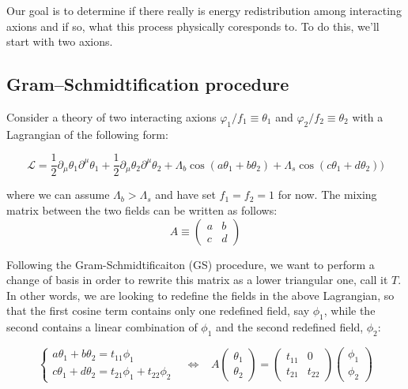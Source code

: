 \documentclass[11pt]{article}
\begin{document}
Our goal is to determine if there really is energy redistribution among interacting axions and if so, what this process physically coresponds to. To do this, we'll start with two axions.

\subsection{Gram–Schmidtification procedure}
\label{subsec:GS-2-axions}
Consider a theory of two interacting axions $\varphi_1/f_1\equiv\theta_1$ and $\varphi_2/f_2\equiv\theta_2$ with a Lagrangian of the following form:

\begin{equation}
    \label{eq:pre-GS-potential}
    \mathcal{L} = \frac{1}{2}\partial_\mu\theta_1 \partial^\mu\theta_1  + \frac{1}{2}\partial_\mu\theta_2 \partial^\mu\theta_2  + \Lambda_{b}\cos{(a\theta_1+b\theta_2)}+\Lambda_{s}\cos{(c\theta_1+d\theta_2))}
\end{equation}

\noindent where we can assume $\Lambda_b>\Lambda_s$ and have set $f_1 = f_2 = 1$ for now. The mixing matrix between the two fields can be written as follows:
\begin{equation}
A \equiv
    \begin{pmatrix}
    a & b\\
    c & d
    \end{pmatrix}
\end{equation}

Following the Gram-Schmidtificaiton (GS) procedure, we want to perform a change of basis in order to rewrite this  matrix as a lower triangular one, call it $T$. In other words, we are looking to redefine the fields in the above Lagrangian, so that the first cosine term contains only one redefined field, say $\phi_1$, while the second contains a linear combination of  $\phi_1$ and the second redefined field, $\phi_2$:

\begin{equation}
    \label{eq:triang}
    \begin{cases}
        a\theta_1+b\theta_2 = t_{11} \phi_1 \\ 
        c\theta_1+d\theta_2 = t_{21} \phi_1 + t_{22} \phi_2
    \end{cases} \,\,\,\,\,
    \Leftrightarrow \,\,\,\,\,
    A \begin{pmatrix}
        \theta_1 \\
        \theta_2
    \end{pmatrix}
    = 
    \begin{pmatrix}
        t_{11} & 0 \\
        t_{21} &t_{22} 
    \end{pmatrix} 
    \begin{pmatrix}
        \phi_1 \\
        \phi_2
    \end{pmatrix}
\end{equation}
\end{document}
